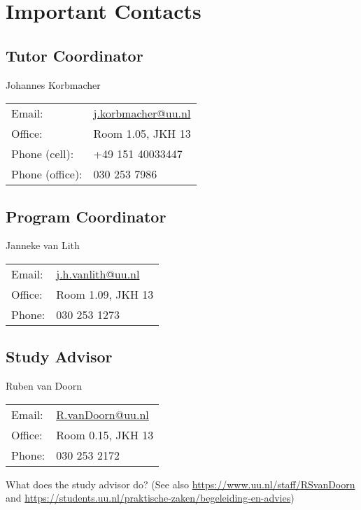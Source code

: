 \chapter{Important Contacts}

\section{Tutor Coordinator}

Johannes Korbmacher\\[1ex]
\begin{tabular}{l l}
Email: & \href{mailto:j.korbmacher@uu.nl}{j.korbmacher@uu.nl}\\
Office: & Room 1.05, JKH 13\\
Phone (cell): & +49 151 40033447\\
Phone (office): & 030 253 7986
\end{tabular}

\section{Program Coordinator}

Janneke van Lith\\[1ex]
\begin{tabular}{l l}
Email: & \href{mailto:j.h.vanlith@uu.nl}{j.h.vanlith@uu.nl}\\
Office: & Room 1.09, JKH 13\\
Phone: & 030 253 1273
\end{tabular}

\section{Study Advisor}

Ruben van Doorn\\[1ex]
\begin{tabular}{l l}
Email: & \href{mailto:R.vanDoorn@uu.nl}{R.vanDoorn@uu.nl}\\
Office: & Room 0.15, JKH 13\\
Phone: & 030 253 2172
\end{tabular}

\vspace{2ex}

\noindent What does the study advisor do?
(See also \url{https://www.uu.nl/staff/RSvanDoorn} and \url{https://students.uu.nl/praktische-zaken/begeleiding-en-advies})

